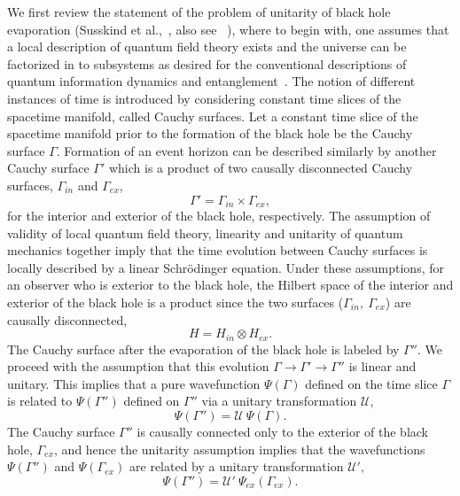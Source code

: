 \documentclass[12pt,letterpaper,aps,onecolumn,superscriptaddress,floatfix,notitlepage]{revtex4-1}
\begin{document}
	We first review the statement of the problem of unitarity of black hole evaporation (Susskind et al.,~\cite{complementarity}, also see ~\cite{infopara}), where to begin with, one assumes that a local description of quantum field theory exists and the universe can be factorized in to subsystems as desired for the conventional descriptions of quantum information dynamics and entanglement~\cite{horowitz,infopara,projection}. The notion of different instances of time is introduced by considering constant time slices of the spacetime manifold, called Cauchy surfaces. Let a constant time slice of the spacetime manifold prior to the formation of the black hole be the Cauchy surface $\Gamma$. Formation of an event horizon can be described similarly by another Cauchy surface $\Gamma'$ which is a product of two causally disconnected Cauchy surfaces, $\Gamma_{in}$ and $\Gamma_{ex}$,
	\begin{equation}
	\Gamma' = \Gamma_{in}\times\Gamma_{ex},\end{equation}
	for the interior and exterior of the black hole, respectively. The assumption of validity of local quantum field theory, linearity and unitarity of quantum mechanics together imply that the time evolution between Cauchy surfaces is locally described by a linear Schr\"{o}dinger equation. Under these assumptions, for an observer who is exterior to the black hole, the Hilbert space of the interior and exterior of the black hole is a product since the two surfaces ($\Gamma_{in},~\Gamma_{ex}$) are causally disconnected,
	\begin{equation}
	H=H_{in}\otimes H_{ex}.
	\end{equation}
	The Cauchy surface after the evaporation of the black hole is labeled by $\Gamma''$. We proceed with the assumption that this evolution  $\Gamma\rightarrow\Gamma'\rightarrow\Gamma''$ is linear and unitary. This implies that a pure wavefunction $\Psi(\Gamma)$ defined on the time slice $\Gamma$ is related to $\Psi(\Gamma'')$ defined on $\Gamma''$  via a unitary transformation $\mathcal{U}$,
	\begin{equation}
	\Psi(\Gamma'')=\mathcal{U}~\Psi(\Gamma).
	\end{equation}
	The Cauchy surface $\Gamma''$ is causally connected only to the exterior of the black hole, $\Gamma_{ex}$, and hence the unitarity assumption implies that the wavefunctions $\Psi(\Gamma'')$ and $\Psi(\Gamma_{ex})$ are related by a unitary transformation $\mathcal{U'}$,   
	\begin{equation}
	\Psi(\Gamma'') = \mathcal{U'}~\Psi_{ex}(\Gamma_{ex}).
	\end{equation}
\end{document}
